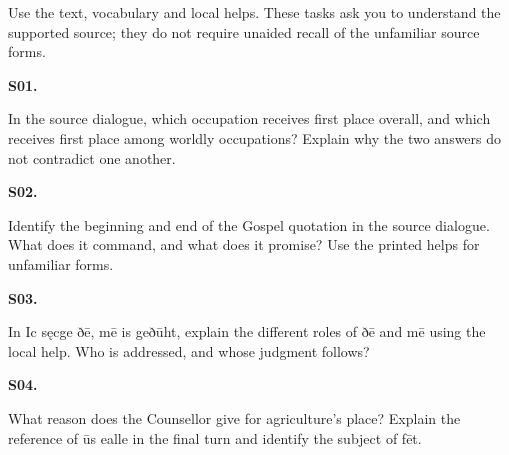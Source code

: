 Use the text, vocabulary and local helps. These tasks ask you to understand the supported source; they do not require unaided recall of the unfamiliar source forms.

\par\begin{minipage}{\linewidth}\raggedright
\textbf{S01.}

In the source dialogue, which occupation receives first place overall, and which receives first place among worldly occupations? Explain why the two answers do not contradict one another.

\end{minipage}\par\addvspace{4pt}

\par\begin{minipage}{\linewidth}\raggedright
\textbf{S02.}

Identify the beginning and end of the Gospel quotation in the source dialogue. What does it command, and what does it promise? Use the printed helps for unfamiliar forms.

\end{minipage}\par\addvspace{4pt}

\par\begin{minipage}{\linewidth}\raggedright
\textbf{S03.}

In Ic sęcge ðē, mē is geðūht, explain the different roles of ðē and mē using the local help. Who is addressed, and whose judgment follows?

\end{minipage}\par\addvspace{4pt}

\par\begin{minipage}{\linewidth}\raggedright
\textbf{S04.}

What reason does the Counsellor give for agriculture's place? Explain the reference of ūs ealle in the final turn and identify the subject of fēt.

\end{minipage}\par\addvspace{4pt}

